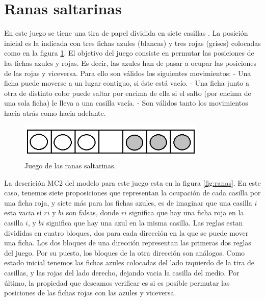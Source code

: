 \section{Ranas saltarinas}

En este juego se tiene una tira de papel dividida en siete casillas \cite{Juegos:11}. La posición inicial es la indicada con tres fichas azules (blancas) y tres rojas (grises) colocadas como en la figura \ref{fig:ranasjuego}.
El objetivo del juego consiste en permutar las posiciones de las fichas azules y rojas. Es decir, las azules han de pasar a ocupar las posiciones de las rojas y viceversa. Para ello son válidos los siguientes movimientos:
- Una ficha puede moverse a un lugar contiguo, si éste está vacío.
- Una ficha junto a otra de distinto color puede saltar por encima de ella si el salto (por encima de una sola ficha) le lleva a una casilla vacía.
- Son válidos tanto los movimientos hacia atrás como hacia adelante.

\begin{figure}[H]
  \centering
  \includegraphics[width=0.8\textwidth]{Figures/ranasjuego.png}
  \caption{Juego de las ranas saltarinas.}
  \label{fig:ranasjuego}
\end{figure}

La descrición MC2 del modelo para este juego esta en la figura \ref{fig:ranas}. En este caso, tenemos siete proposiciones que representan la ocupación de cada casilla por una ficha roja, y siete más para las fichas azules, es de imaginar que una casilla $i$ esta vacia si $ri$ y $bi$ son falsas, donde $ri$ significa que hay una ficha roja en la casilla $i$, y $bi$ significa que hay una azul en la misma casilla. Las reglas estan divididas en cuatro bloques, dos para cada dirección en la que se puede mover una ficha. Los dos bloques de una dirección representan las primeras dos reglas del juego. Por su puesto, los bloques de la otra dirección son análogos. Como estado inicial tenemos las fichas azules colocadas del lado izquierdo de la tira de casillas, y las rojas del lado derecho, dejando vacia la casilla del medio. Por último, la propiedad que deseamos verificar es si es posible permutar las posiciones de las fichas rojas con las azules y viceversa. 

